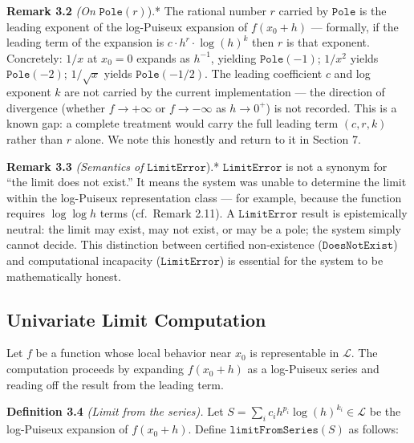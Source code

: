 \documentclass[12pt]{article}
\begin{document}
\textbf{Remark 3.2} \emph{(On} \(\mathtt{Pole}(r)\)).* The rational
number \(r\) carried by \(\mathtt{Pole}\) is the leading exponent of the
log-Puiseux expansion of \(f(x_0 + h)\) --- formally, if the leading
term of the expansion is \(c \cdot h^r \cdot \log(h)^k\) then \(r\) is
that exponent. Concretely: \(1/x\) at \(x_0 = 0\) expands as \(h^{-1}\),
yielding \(\mathtt{Pole}(-1)\); \(1/x^2\) yields \(\mathtt{Pole}(-2)\);
\(1/\sqrt{x}\) yields \(\mathtt{Pole}(-1/2)\). The leading coefficient
\(c\) and log exponent \(k\) are not carried by the current
implementation --- the direction of divergence (whether
\(f \to +\infty\) or \(f \to -\infty\) as \(h \to 0^+\)) is not
recorded. This is a known gap: a complete treatment would carry the full
leading term \((c, r, k)\) rather than \(r\) alone. We note this
honestly and return to it in Section 7.

\textbf{Remark 3.3} \emph{(Semantics of} \(\mathtt{LimitError}\)).*
\(\mathtt{LimitError}\) is not a synonym for ``the limit does not
exist.'' It means the system was unable to determine the limit within
the log-Puiseux representation class --- for example, because the
function requires \(\log \log h\) terms (cf.~Remark 2.11). A
\(\mathtt{LimitError}\) result is epistemically neutral: the limit may
exist, may not exist, or may be a pole; the system simply cannot decide.
This distinction between certified non-existence
(\(\mathtt{DoesNotExist}\)) and computational incapacity
(\(\mathtt{LimitError}\)) is essential for the system to be
mathematically honest.




\subsection{Univariate Limit
Computation}\label{univariate-limit-computation}

Let \(f\) be a function whose local behavior near \(x_0\) is
representable in \(\mathcal{L}\). The computation proceeds by expanding
\(f(x_0 + h)\) as a log-Puiseux series and reading off the result from
the leading term.

\textbf{Definition 3.4} \emph{(Limit from the series).} Let
\(S = \sum_i c_i h^{p_i} \log(h)^{k_i} \in \mathcal{L}\) be the
log-Puiseux expansion of \(f(x_0 + h)\). Define
\(\mathtt{limitFromSeries}(S)\) as follows:
\end{document}
